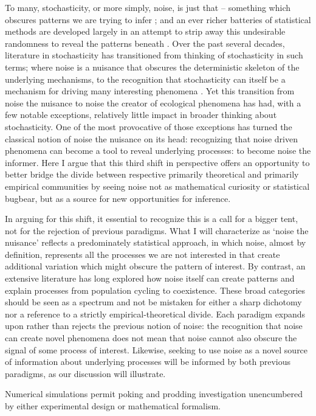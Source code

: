 \documentclass[
  authoryear,
  preprint,
  3p]{elsarticle}
\begin{document}
To many, stochasticity, or more simply, noise, is just that -- something
which obscures patterns we are trying to infer \citep{Knape2011}; and an
ever richer batteries of statistical methods are developed largely in an
attempt to strip away this undesirable randomness to reveal the patterns
beneath \citep{Coulson2001}. Over the past several decades, literature
in stochasticity has transitioned from thinking of stochasticity in such
terms; where noise is a nuisance that obscures the deterministic
skeleton of the underlying mechanisms, to the recognition that
stochasticity can itself be a mechanism for driving many interesting
phenomena \citep{Coulson2004}. Yet this transition from noise the
nuisance to noise the creator of ecological phenomena has had, with a
few notable exceptions, relatively little impact in broader thinking
about stochasticity. One of the most provocative of those exceptions has
turned the classical notion of noise the nuisance on its head:
recognizing that noise driven phenomena can become a tool to reveal
underlying processes: to become noise the informer. Here I argue that
this third shift in perspective offers an opportunity to better bridge
the divide between respective primarily theoretical and primarily
empirical communities by seeing noise not as mathematical curiosity or
statistical bugbear, but as a source for new opportunities for
inference.

In arguing for this shift, it essential to recognize this is a call for
a bigger tent, not for the rejection of previous paradigms. What I will
characterize as `noise the nuisance' reflects a predominately
statistical approach, in which noise, almost by definition, represents
all the processes we are not interested in that create additional
variation which might obscure the pattern of interest. By contrast, an
extensive literature has long explored how noise itself can create
patterns and explain processes from population cycling to coexistence.
These broad categories should be seen as a spectrum and not be mistaken
for either a sharp dichotomy nor a reference to a strictly
empirical-theoretical divide. Each paradigm expands upon rather than
rejects the previous notion of noise: the recognition that noise can
create novel phenomena does not mean that noise cannot also obscure the
signal of some process of interest. Likewise, seeking to use noise as a
novel source of information about underlying processes will be informed
by both previous paradigms, as our discussion will illustrate.

Numerical simulations permit poking and prodding investigation
unencumbered by either experimental design or mathematical formalism.
\end{document}
